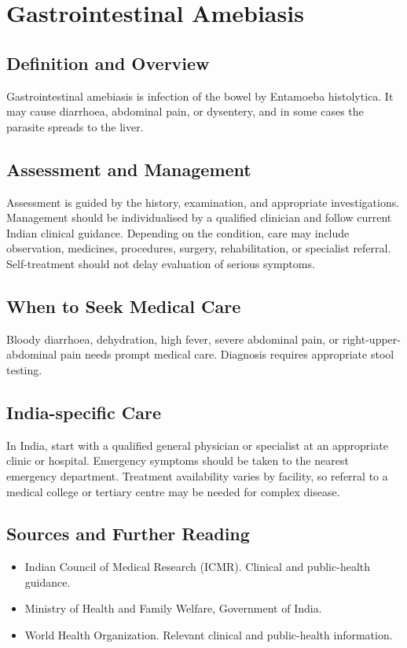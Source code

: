 \chapter{Gastrointestinal Amebiasis}

\section*{Definition and Overview}
Gastrointestinal amebiasis is infection of the bowel by Entamoeba histolytica. It may cause diarrhoea, abdominal pain, or dysentery, and in some cases the parasite spreads to the liver.

\section*{Assessment and Management}
Assessment is guided by the history, examination, and appropriate investigations. Management should be individualised by a qualified clinician and follow current Indian clinical guidance. Depending on the condition, care may include observation, medicines, procedures, surgery, rehabilitation, or specialist referral. Self-treatment should not delay evaluation of serious symptoms.

\section*{When to Seek Medical Care}
Bloody diarrhoea, dehydration, high fever, severe abdominal pain, or right-upper-abdominal pain needs prompt medical care. Diagnosis requires appropriate stool testing.

\section*{India-specific Care}
In India, start with a qualified general physician or specialist at an appropriate clinic or hospital. Emergency symptoms should be taken to the nearest emergency department. Treatment availability varies by facility, so referral to a medical college or tertiary centre may be needed for complex disease.

\section*{Sources and Further Reading}
\begin{itemize}
    \item Indian Council of Medical Research (ICMR). Clinical and public-health guidance.
    \item Ministry of Health and Family Welfare, Government of India.
    \item World Health Organization. Relevant clinical and public-health information.
\end{itemize}

